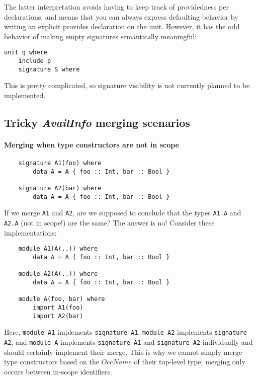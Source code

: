 \documentclass{article}
\newcommand{\I}[1]{\ensuremath{\mathit{#1}}}
\begin{document}
The latter interpretation avoids having to keep track of providedness
per declarations, and means that you can always express defaulting
behavior by writing an explicit provides declaration on the unit.
However, it has the odd behavior of making empty signatures semantically
meaningful:

\begin{verbatim}
unit q where
    include p
    signature S where
\end{verbatim}
%

This is pretty complicated, so signature visibility is not currently
planned to be implemented.

\subsection{Tricky \textit{AvailInfo} merging scenarios}

\paragraph{Merging when type constructors are not in scope}

\begin{verbatim}
    signature A1(foo) where
        data A = A { foo :: Int, bar :: Bool }

    signature A2(bar) where
        data A = A { foo :: Int, bar :: Bool }
\end{verbatim}
%
If we merge \verb|A1| and \verb|A2|, are we supposed to conclude that
the types \verb|A1.A| and \verb|A2.A| (not in scope!) are the same?
The answer is no!  Consider these implementations:

\begin{verbatim}
    module A1(A(..)) where
        data A = A { foo :: Int, bar :: Bool }

    module A2(A(..)) where
        data A = A { foo :: Int, bar :: Bool }

    module A(foo, bar) where
        import A1(foo)
        import A2(bar)
\end{verbatim}

Here, \verb|module A1| implements \verb|signature A1|, \verb|module A2| implements \verb|signature A2|,
and \verb|module A| implements \verb|signature A1| and \verb|signature A2| individually
and should certainly implement their merge.  This is why we cannot simply
merge type constructors based on the \I{OccName} of their top-level type;
merging only occurs between in-scope identifiers.
\end{document}
